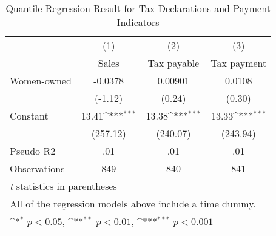 \begin{table}[htbp]\centering
\def\sym#1{\ifmmode^{#1}\else\(^{#1}\)\fi}
\caption{Quantile Regression Result for Tax Declarations and Payment Indicators}
\begin{tabular}{l*{3}{c}}
\hline\hline
            &\multicolumn{1}{c}{(1)}&\multicolumn{1}{c}{(2)}&\multicolumn{1}{c}{(3)}\\
            &\multicolumn{1}{c}{Sales}&\multicolumn{1}{c}{Tax payable}&\multicolumn{1}{c}{Tax payment}\\
\hline
Women-owned &     -0.0378         &     0.00901         &      0.0108         \\
            &     (-1.12)         &      (0.24)         &      (0.30)         \\
[1em]
Constant    &       13.41\sym{***}&       13.38\sym{***}&       13.33\sym{***}\\
            &    (257.12)         &    (240.07)         &    (243.94)         \\
\hline
Pseudo R2   &         .01         &         .01         &         .01         \\
Observations&         849         &         840         &         841         \\
\hline\hline
\multicolumn{4}{l}{\footnotesize \textit{t} statistics in parentheses}\\
\multicolumn{4}{l}{\footnotesize All of the regression models above include a time dummy.}\\
\multicolumn{4}{l}{\footnotesize \sym{*} \(p<0.05\), \sym{**} \(p<0.01\), \sym{***} \(p<0.001\)}\\
\end{tabular}
\end{table}
